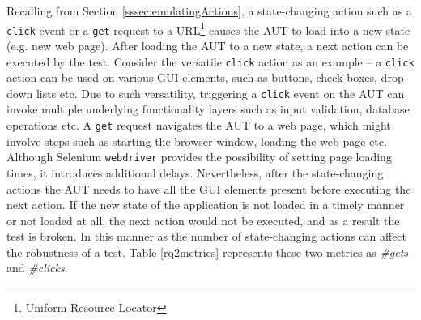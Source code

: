 Recalling from Section \ref{sssec:emulatingActions}, a state-changing action such as a \texttt{click} event or a \texttt{get} request to a URL\footnote{Uniform Resource Locator} causes the AUT to load into a new state (e.g. new web page). After loading the AUT to a new state, a next action can be executed by the test. Consider the versatile \texttt{click} action as an example -- a \texttt{click} action can be used on various GUI elements, such as buttons, check-boxes, drop-down lists etc. Due to such versatility, triggering a \texttt{click} event on the AUT can invoke multiple underlying functionality layers such as input validation, database operations etc. A \texttt{get} request navigates the AUT to a web page, which might involve steps such as starting the browser window, loading the web page etc. Although Selenium \texttt{webdriver} provides the possibility of setting page loading times, it introduces additional delays. Nevertheless, after the state-changing actions the AUT needs to have all the GUI elements present before executing the next action. If the new state of the application is not loaded in a timely manner or not loaded at all, the next action would not be executed, and as a result the test is broken. In this manner as the number of state-changing actions can affect the robustness of a test. Table \ref{rq2metrics} represents these two metrics as \textit{\#gets} and \textit{\#clicks}.

